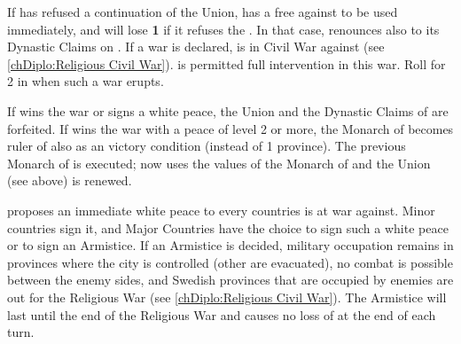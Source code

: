 
\phdipl
\aparag If \POL has refused a continuation of the Union, \RUS has a free \CB
against \POL to be used immediately, and will lose {\bf 1} \STAB if it refuses
the \CB. In that case, \RUS renounces also to its Dynastic Claims on \POL.
\aparag If a war is declared, \POL is in Civil War against \RUS (see
\ref{chDiplo:Religious Civil War}). \RUS is permitted full intervention in
this war.
\aparag Roll for 2 \REVOLT in \POL when such a war erupts.

\phpaix
\aparag If \POL wins the war or signs a white peace, the Union and the
Dynastic Claims of \RUS are forfeited.
\aparag If \RUS wins the war with a peace of level 2 or more, the Monarch of
\RUS becomes ruler of \POL also as an victory condition (instead of 1
province).
\bparag The previous Monarch of \POL is executed; now \POL uses the values of
the Monarch of \RUS and the Union (see above) is renewed.





\condition{}
\aparag \SUE proposes an immediate white peace to every countries is at war
against.  Minor countries sign it, and Major Countries have the choice to sign
such a white peace or to sign an Armistice. If an Armistice is decided,
military occupation remains in provinces where the city is controlled (other
are evacuated), no combat is possible between the enemy sides, and Swedish
provinces that are occupied by enemies are out for the Religious War (see
\ref{chDiplo:Religious Civil War}). The Armistice will last until the end of
the Religious War and causes no loss of \STAB at the end of each turn.


